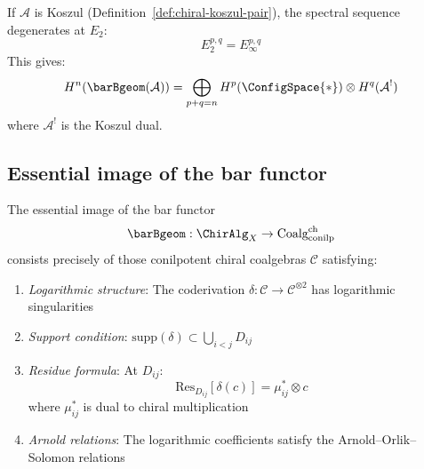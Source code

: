 \begin{corollary}
\label{cor:spectral-degeneration}
If $\mathcal{A}$ is Koszul (Definition~\ref{def:chiral-koszul-pair}), the spectral sequence degenerates at $E_2$:
\[E_2^{p,q} = E_\infty^{p,q}\]
This gives:
\[H^n(\barBgeom(\mathcal{A})) = \bigoplus_{p+q=n} H^p(\ConfigSpace{*}) \otimes H^q(\mathcal{A}^!)\]
where $\mathcal{A}^!$ is the Koszul dual.
\end{corollary}

\subsection{Essential image of the bar functor}

\begin{theorem}
\label{thm:essential-image-bar}
The essential image of the bar functor 
\[\barBgeom: \ChirAlg_X \to \text{Coalg}_{\text{conilp}}^{\text{ch}}\]
consists precisely of those conilpotent chiral coalgebras $\mathcal{C}$ satisfying:
\begin{enumerate}
\item \emph{Logarithmic structure}: The coderivation $\delta: \mathcal{C} \to \mathcal{C}^{\otimes 2}$ has logarithmic singularities
\item \emph{Support condition}: $\text{supp}(\delta) \subset \bigcup_{i<j} D_{ij}$
\item \emph{Residue formula}: At $D_{ij}$:
\[\text{Res}_{D_{ij}}[\delta(c)] = \mu_{ij}^* \otimes c\]
where $\mu_{ij}^*$ is dual to chiral multiplication
\item \emph{Arnold relations}: The logarithmic coefficients satisfy the Arnold--Orlik--Solomon relations
\end{enumerate}
\end{theorem}

